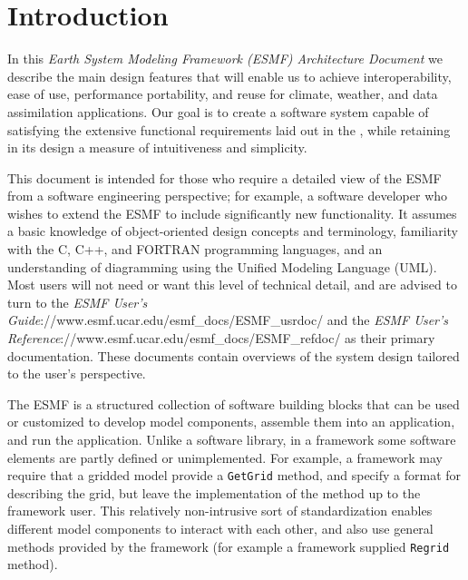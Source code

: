 \section{Introduction}
\label{sec:intro}

In this {\it Earth System Modeling Framework (ESMF) Architecture Document} we describe 
the main design features that will enable us to achieve interoperability, ease of 
use, performance portability, and reuse for climate, weather, and data assimilation
applications.  Our goal is to create a software system capable of satisfying
the extensive functional requirements laid out in the  
\cite{bib:ESMFreqdoc}, while retaining in its design a measure of intuitiveness 
and simplicity. 

This document is intended for those who require a detailed view of the ESMF
from a software engineering perspective; for example, a software developer who
wishes to extend the ESMF to include significantly new functionality.  It assumes 
a basic knowledge of object-oriented design concepts and terminology, familiarity 
with the C, C++, and FORTRAN programming languages, and an understanding of 
diagramming using the Unified Modeling Language (UML).  Most users will 
not need or want this level of technical detail, and are advised to turn to 
the {\it ESMF User's Guide}{\http://www.esmf.ucar.edu/esmf\_docs/ESMF\_usrdoc/} 
and the {\it ESMF User's Reference}{\http://www.esmf.ucar.edu/esmf\_docs/ESMF\_refdoc/} 
as their primary documentation.  These documents contain overviews of the system 
design tailored to the user's perspective.

The ESMF is a structured collection of software building blocks 
that can be used or customized to develop model components, assemble them into an 
application, and run the application.  Unlike a software library, in a framework some
software elements are partly defined or unimplemented.  For example, a framework
may require that a gridded model provide a {\tt GetGrid} method, and specify 
a format for describing the grid, but leave the implementation of the method up
to the framework user.  This relatively non-intrusive sort of standardization enables 
different model components to interact with each other, and also
use general methods provided by the framework (for example a framework supplied
{\tt Regrid} method).

